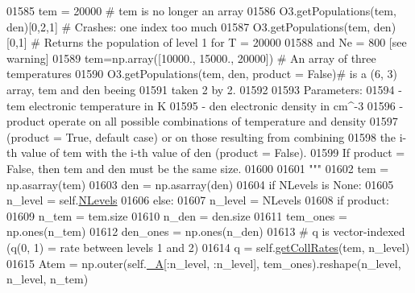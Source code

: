 \begin{DoxyCode}
01585 \textcolor{stringliteral}{            tem = 20000                           # tem is no longer an array}
01586 \textcolor{stringliteral}{            O3.getPopulations(tem, den)[0,2,1]  # Crashes: one index too much}
01587 \textcolor{stringliteral}{            O3.getPopulations(tem, den)[0,1]    # Returns the population of level 1 for T = 20000 }
01588 \textcolor{stringliteral}{                                                    and Ne = 800 [see warning]}
01589 \textcolor{stringliteral}{            tem=np.array([10000., 15000., 20000]) # An array of three temperatures}
01590 \textcolor{stringliteral}{            O3.getPopulations(tem, den, product = False)# is a (6, 3) array, tem and den beeing }
01591 \textcolor{stringliteral}{                                                            taken 2 by 2.}
01592 \textcolor{stringliteral}{        }
01593 \textcolor{stringliteral}{        Parameters:}
01594 \textcolor{stringliteral}{            - tem       electronic temperature in K}
01595 \textcolor{stringliteral}{            - den       electronic density in cm^-3}
01596 \textcolor{stringliteral}{            - product   operate on all possible combinations of temperature and density }
01597 \textcolor{stringliteral}{                      (product = True, default case) or on those resulting from combining }
01598 \textcolor{stringliteral}{                      the i-th value of tem with the i-th value of den (product = False).}
01599 \textcolor{stringliteral}{                      If product = False, then tem and den must be the same size.}
01600 \textcolor{stringliteral}{}
01601 \textcolor{stringliteral}{        """}
01602         tem = np.asarray(tem)
01603         den = np.asarray(den)
01604         \textcolor{keywordflow}{if} NLevels \textcolor{keywordflow}{is} \textcolor{keywordtype}{None}:
01605             n\_level = self.\hyperlink{classpyneb_1_1core_1_1pynebcore_1_1_atom_a6b43c1e6431a6786c1b4267f704fb4e8}{NLevels}
01606         \textcolor{keywordflow}{else}:
01607             n\_level = NLevels
01608         \textcolor{keywordflow}{if} product:
01609             n\_tem = tem.size
01610             n\_den = den.size
01611             tem\_ones = np.ones(n\_tem)
01612             den\_ones = np.ones(n\_den)
01613             \textcolor{comment}{# q is vector-indexed (q(0, 1) = rate between levels 1 and 2)}
01614             q = self.\hyperlink{classpyneb_1_1core_1_1pynebcore_1_1_atom_a34711ea989baf7bde752a68255d32098}{getCollRates}(tem, n\_level)
01615             Atem = np.outer(self.\hyperlink{classpyneb_1_1core_1_1pynebcore_1_1_atom_aa6416fe661b8deaa008179314727e025}{\_A}[:n\_level, :n\_level], tem\_ones).reshape(n\_level, n\_level, n\_tem)

\end{DoxyCode}
